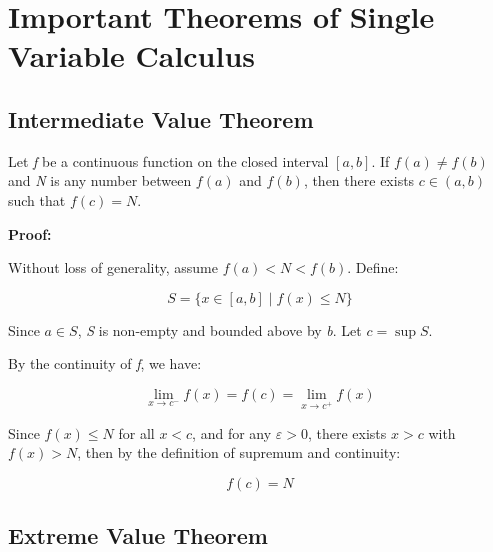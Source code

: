 \newpage
\section{Important Theorems of Single Variable Calculus}

\subsection{Intermediate Value Theorem}

Let \emph{f} be a continuous function on the closed interval \([a, b]\). If \( f(a) \ne f(b) \) 
and \emph{N} is any number between \( f(a) \) and \( f(b) \), then there exists \( c \in (a, b) \) 
such that \( f(c) = N \).
\vspace{\baselineskip}

\textbf{Proof:}  

Without loss of generality, assume \( f(a) < N < f(b) \).  
Define:

\[
    S = \{ x \in [a, b] \mid f(x) \le N \}
\]

Since \( a \in S \), \emph{S} is non-empty and bounded above by \emph{b}. Let \( c = \sup S \).

By the continuity of \emph{f}, we have:

\[
    \lim_{x \to c^-} f(x) = f(c) = \lim_{x \to c^+} f(x)
\]

Since \( f(x) \le N \) for all \( x < c \), and for any \( \varepsilon > 0 \), 
there exists \( x > c \) with \( f(x) > N \), then by the definition of supremum and continuity:

\[
    f(c) = N
\]

\QED

\begin{center}
\end{center}

\subsection{Extreme Value Theorem}

